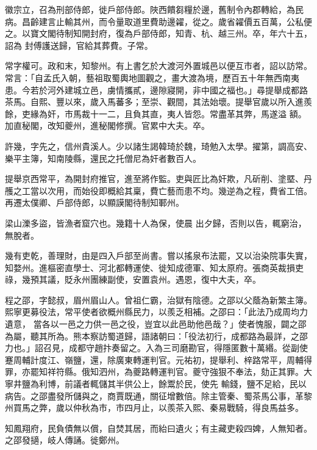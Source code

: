 \begin{pinyinscope}
 徽宗立，召為刑部侍郎，徙戶部侍郎。陜西饋芻糧於邊，舊制令內郡轉給，為民病。昌齡建言止輸其州，而令量取道里費助邊糴，從之。歲省糴價五百萬，公私便之。以寶文閣待制知開封府，復為戶部侍郎，知青、杭、越三州。卒，年六十五，詔為
 封傅護送歸，官給其葬費。子常。



 常字權可。政和末，知黎州。有上書乞於大渡河外置城邑以便互市者，詔以訪常。常言：「自孟氏入朝，藝祖取蜀輿地圖觀之，畫大渡為境，歷百五十年無西南夷患。今若於河外建城立邑，虜情攜貳，邊隙寢開，非中國之福也。」尋提舉成都路茶馬。自熙、豐以來，歲入馬蕃多；至崇、觀間，其法始壞。提舉官歲以所入進羨餘，吏緣為奸，市馬裁十一二，且負其直，夷人皆怨。常盡革其弊，馬遂溢
 額。加直秘閣，改知夔州，進秘閣修撰。官累中大夫。卒。



 許幾，字先之，信州貴溪人。少以諸生謁韓琦於魏，琦勉入太學。擢第，調高安、樂平主簿，知南陵縣，還民之托僧尼為奸者數百人。



 提舉京西常平，為開封府推官，進至將作監。吏與匠比為奸欺，凡斫削、塗塈、丹雘之工當以次用，而始役即概給其稟，費亡藝而患不均。幾逆為之程，費省工倍。再遷太僕卿、戶部侍郎，以顯謨閣待制知鄆州。



 梁山濼多盜，皆漁者窟穴也。幾籍十人為保，使晨
 出夕歸，否則以告，輒窮治，無脫者。



 幾有吏乾，善理財，由是四入戶部至尚書。嘗以搖泉布法罷，又以治染院事失實，知婺州。進樞密直學士、河北都轉運使、徙知成德軍、知太原府。張商英裁損吏祿，幾預其議，貶永州團練副使，安置袁州。遇恩，復中大夫，卒。



 程之邵，字懿叔，眉州眉山人。曾祖仁霸，治獄有陰德。之邵以父蔭為新繁主簿。熙寧更募役法，常平使者欲概州縣民力，以羨乏相補。之邵曰：「此法乃成周均力遺意，
 當各以一邑之力供一邑之役，豈宜以此邑助他邑哉？」使者愧服，闢之邵為屬，聽其所為。熊本察訪蜀道歸，語諸朝曰：「役法初行，成都路為最詳，之邵力也。」詔召見，成都守趙抃奏留之。入為三司磨勘官，得隱匿數十萬緡。從副使蹇周輔計度江、嶺鹽，還，除廣東轉運判官。元祐初，提舉利、梓路常平，周輔得罪，亦罷知祥符縣。俄知泗州，為夔路轉運判官。夔守強狠不奉法，劾正其罪。大寧井鹽為利博，前議者輒儲其半供公上，餘鬻於民，使先
 輸錢，鹽不足給，民以病告。之邵盡發所儲與之，商賈既通，關征增數倍。除主管秦、蜀茶馬公事，革黎州買馬之弊，歲以仲秋為市，市四月止，以羨茶入熙、秦易戰騎，得良馬益多。



 知鳳翔府，民負債無以償，自焚其居，而紿曰遺火；有主藏吏殺四婢，人無知者。之邵發擿，岐人傳誦。徙鄭州。




\end{pinyinscope}
